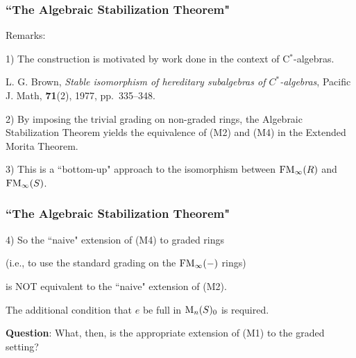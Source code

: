 \documentclass{beamer}
\begin{document}
\begin{frame}
\frametitle{``The Algebraic Stabilization Theorem"}

Remarks:    

\bigskip

1)  The construction is motivated by work done  in the context of C$^*$-algebras.    

\medskip

\footnotesize

L. G. Brown,  \emph{Stable isomorphism of hereditary subalgebras of {$C^*$}-algebras}, Pacific J. Math, \textbf{71}(2), 1977, pp.~335--348.

\normalsize

\bigskip

2)   By imposing the trivial grading on non-graded rings, the Algebraic Stabilization Theorem yields the equivalence of (M2) and (M4) in the Extended Morita Theorem.

\bigskip

3)   This is a ``bottom-up" approach to the isomorphism between ${\rm FM}_\infty(R)$ and ${\rm FM}_\infty(S)$.   

   \end{frame}


\begin{frame}
\frametitle{``The Algebraic Stabilization Theorem"}

4)   So the ``naive" extension of (M4) to graded rings

\medskip

\qquad  (i.e., to use the standard grading on the ${\rm FM}_\infty( - )$ rings) 
 
 \medskip
 
 is NOT equivalent to the ``naive" extension of (M2).
 
 \medskip
 
 
 The additional condition that $e$ be full in ${\rm M}_n(S)_0$ is required.  
 
 \bigskip
 \bigskip
 \pause
 
 {\bf Question}:  What, then, is the appropriate extension of (M1) to the graded setting?  





\end{frame}
\end{document}
